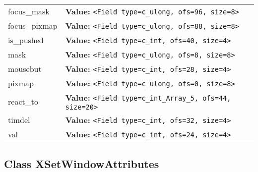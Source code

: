 \begin{longtable}{|p{\varnamewidth}|p{\vardescrwidth}|l}
\cline{1-2}
\raggedright f\-o\-c\-u\-s\-\_\-m\-a\-s\-k\- & \raggedright \textbf{Value:} 
{\tt {\textless}Field type=c\_ulong, ofs=96, size=8{\textgreater}}&\\
\cline{1-2}
\raggedright f\-o\-c\-u\-s\-\_\-p\-i\-x\-m\-a\-p\- & \raggedright \textbf{Value:} 
{\tt {\textless}Field type=c\_ulong, ofs=88, size=8{\textgreater}}&\\
\cline{1-2}
\raggedright i\-s\-\_\-p\-u\-s\-h\-e\-d\- & \raggedright \textbf{Value:} 
{\tt {\textless}Field type=c\_int, ofs=40, size=4{\textgreater}}&\\
\cline{1-2}
\raggedright m\-a\-s\-k\- & \raggedright \textbf{Value:} 
{\tt {\textless}Field type=c\_ulong, ofs=8, size=8{\textgreater}}&\\
\cline{1-2}
\raggedright m\-o\-u\-s\-e\-b\-u\-t\- & \raggedright \textbf{Value:} 
{\tt {\textless}Field type=c\_int, ofs=28, size=4{\textgreater}}&\\
\cline{1-2}
\raggedright p\-i\-x\-m\-a\-p\- & \raggedright \textbf{Value:} 
{\tt {\textless}Field type=c\_ulong, ofs=0, size=8{\textgreater}}&\\
\cline{1-2}
\raggedright r\-e\-a\-c\-t\-\_\-t\-o\- & \raggedright \textbf{Value:} 
{\tt {\textless}Field type=c\_int\_Array\_5, ofs=44, size=20{\textgreater}}&\\
\cline{1-2}
\raggedright t\-i\-m\-d\-e\-l\- & \raggedright \textbf{Value:} 
{\tt {\textless}Field type=c\_int, ofs=32, size=4{\textgreater}}&\\
\cline{1-2}
\raggedright v\-a\-l\- & \raggedright \textbf{Value:} 
{\tt {\textless}Field type=c\_int, ofs=24, size=4{\textgreater}}&\\
\cline{1-2}
\end{longtable}



\subsection{Class XSetWindowAttributes}

